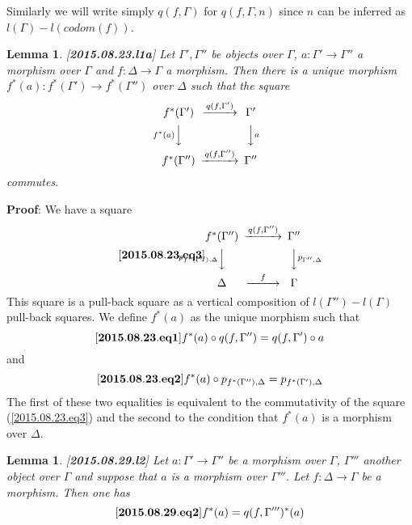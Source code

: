 \documentclass[11pt]{article}
\newenvironment{eq}{\begin{equation}}{\end{equation}}
\newenvironment{proof}{{\bf Proof}:}{\vskip 5mm }
\newtheorem{lemma}[proposition]{Lemma}
\newcommand{\llabel}[1]{\label{#1}[{\bf #1}]}
\newcommand{\sr}{\rightarrow}
\begin{document}
Similarly we will write simply $q(f,\Gamma)$ for $q(f,\Gamma,n)$ since $n$ can be inferred as $l(\Gamma)-l(codom(f))$. 
%
\begin{lemma}
\llabel{2015.08.23.l1a}
Let $\Gamma',\Gamma''$ be objects over $\Gamma$, $a:\Gamma'\sr \Gamma''$ a morphism over $\Gamma$ and $f:\Delta\sr \Gamma$ a morphism. Then there is a unique morphism $f^*(a):f^*(\Gamma')\sr f^*(\Gamma'')$ over $\Delta$ such that the square
%
$$
\begin{CD}
f^*(\Gamma') @>q(f,\Gamma')>> \Gamma'\\
@Vf^*(a)VV @VVaV\\
f^*(\Gamma'') @>q(f,\Gamma'')>> \Gamma''
\end{CD}
$$
%
commutes.
\end{lemma}
%
\begin{proof}
We have a square
%
\begin{eq}\llabel{2015.08.23.eq3}
\begin{CD}
f^*(\Gamma'') @>q(f,\Gamma'')>> \Gamma''\\
@Vp_{f^*(\Gamma''),\Delta}VV @VVp_{\Gamma'',\Delta}V\\
\Delta @>f>> \Gamma\\
\end{CD}
\end{eq}
%
This square is a pull-back square as a vertical composition of $l(\Gamma'')-l(\Gamma)$ pull-back squares. We define $f^*(a)$ as the unique morphism such that 
%
\begin{eq}\llabel{2015.08.23.eq1}
f^*(a)\circ q(f,\Gamma'')=q(f,\Gamma')\circ a
\end{eq}
%
and
%
\begin{eq}\llabel{2015.08.23.eq2}
f^*(a)\circ p_{f^*(\Gamma''),\Delta}=p_{f^*(\Gamma'),\Delta}
\end{eq}
%
The first of these two equalities is equivalent to the commutativity of the square (\ref{2015.08.23.eq3}) and the second to the condition that $f^*(a)$ is a morphism over $\Delta$.
\end{proof}
%
\begin{lemma}
\llabel{2015.08.29.l2}
Let $a:\Gamma'\sr\Gamma''$ be a morphism over $\Gamma$, $\Gamma'''$ another object over $\Gamma$ and suppose that $a$ is a morphism over $\Gamma'''$. Let $f:\Delta\sr \Gamma$ be a morphism. Then one has
%
\begin{eq}\llabel{2015.08.29.eq2}
f^*(a)=q(f,\Gamma''')^*(a)
\end{eq}
%
\end{lemma}
%
\end{document}
